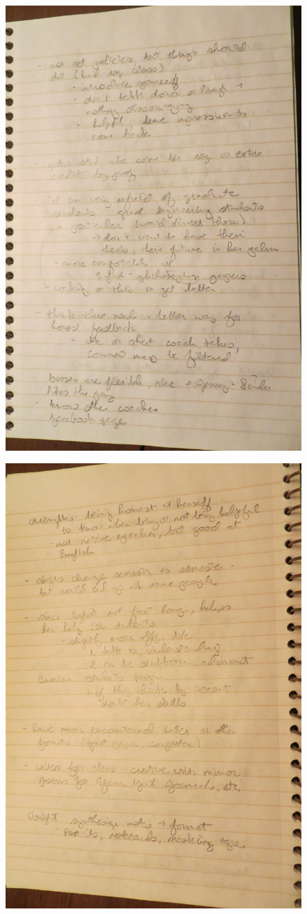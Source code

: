 \documentclass[12pt]{article} %
\begin{document}
  \begin{figure}[H]
  \centering
  \includegraphics[width=0.75\linewidth]{RAZ_raw_notes10}
  \caption{}
  \label{fig:rn10}
  \end{figure}
  \begin{figure}[H]
  \centering
  \includegraphics[width=0.75\linewidth]{RAZ_raw_notes11}
  \caption{}
  \label{fig:rn11}
  \end{figure}
\end{document}
